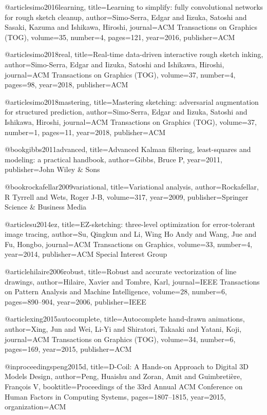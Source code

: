 @article{simo2016learning,
  title={Learning to simplify: fully convolutional networks for rough sketch cleanup},
  author={Simo-Serra, Edgar and Iizuka, Satoshi and Sasaki, Kazuma and Ishikawa, Hiroshi},
  journal={ACM Transactions on Graphics (TOG)},
  volume={35},
  number={4},
  pages={121},
  year={2016},
  publisher={ACM}
}


@article{simo2018real,
  title={Real-time data-driven interactive rough sketch inking},
  author={Simo-Serra, Edgar and Iizuka, Satoshi and Ishikawa, Hiroshi},
  journal={ACM Transactions on Graphics (TOG)},
  volume={37},
  number={4},
  pages={98},
  year={2018},
  publisher={ACM}
}


@article{simo2018mastering,
  title={Mastering sketching: adversarial augmentation for structured prediction},
  author={Simo-Serra, Edgar and Iizuka, Satoshi and Ishikawa, Hiroshi},
  journal={ACM Transactions on Graphics (TOG)},
  volume={37},
  number={1},
  pages={11},
  year={2018},
  publisher={ACM}
}

@book{gibbs2011advanced,
  title={Advanced Kalman filtering, least-squares and modeling: a practical handbook},
  author={Gibbs, Bruce P},
  year={2011},
  publisher={John Wiley \& Sons}
}

@book{rockafellar2009variational,
  title={Variational analysis},
  author={Rockafellar, R Tyrrell and Wets, Roger J-B},
  volume={317},
  year={2009},
  publisher={Springer Science \& Business Media}
}


@article{su2014ez,
  title={EZ-sketching: three-level optimization for error-tolerant image tracing},
  author={Su, Qingkun and Li, Wing Ho Andy and Wang, Jue and Fu, Hongbo},
  journal={ACM Transactions on Graphics},
  volume={33},
  number={4},
  year={2014},
  publisher={ACM Special Interest Group}
}

@article{hilaire2006robust,
  title={Robust and accurate vectorization of line drawings},
  author={Hilaire, Xavier and Tombre, Karl},
  journal={IEEE Transactions on Pattern Analysis and Machine Intelligence},
  volume={28},
  number={6},
  pages={890--904},
  year={2006},
  publisher={IEEE}
}

@article{xing2015autocomplete,
  title={Autocomplete hand-drawn animations},
  author={Xing, Jun and Wei, Li-Yi and Shiratori, Takaaki and Yatani, Koji},
  journal={ACM Transactions on Graphics (TOG)},
  volume={34},
  number={6},
  pages={169},
  year={2015},
  publisher={ACM}
}

@inproceedings{peng2015d,
  title={D-Coil: A Hands-on Approach to Digital 3D Models Design},
  author={Peng, Huaishu and Zoran, Amit and Guimbreti{\`e}re, Fran{\c{c}}ois V},
  booktitle={Proceedings of the 33rd Annual ACM Conference on Human Factors in Computing Systems},
  pages={1807--1815},
  year={2015},
  organization={ACM}
}


